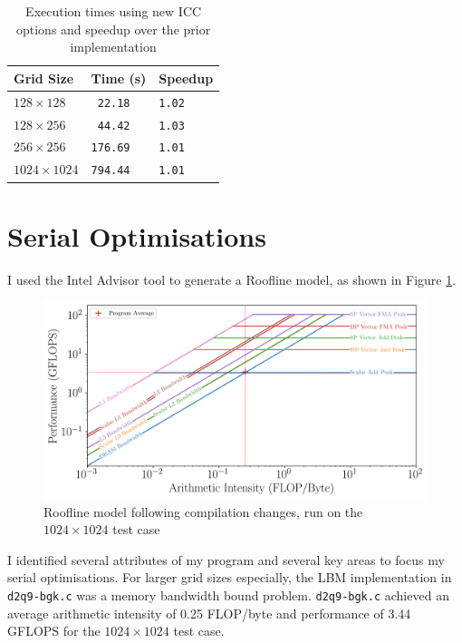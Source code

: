 \documentclass[twocolumn, a4paper]{article}
\begin{document}
\begin{table}[htbp]
  \begin{center}
  \caption{Execution times using new ICC options and speedup over the prior implementation}\label{tab:compiler_options}
  \begin{tabular}[t]{l | l l} 
      \hline\hline
      Grid Size&Time (s)&Speedup\\
      \hline
      $128 \times 128$&\texttt{ 22.18}&\texttt{1.02}\\
      $128 \times 256$&\texttt{ 44.42}&\texttt{1.03}\\
      $256 \times 256$&\texttt{176.69}&\texttt{1.01}\\
      $1024 \times 1024$&\texttt{794.44}&\texttt{1.01}\\
      \hline
    \end{tabular}
  \end{center}
  \vspace{-1em}
\end{table}

\section{Serial Optimisations}

I used the Intel Advisor tool to generate a Roofline model, as shown in Figure \ref{fig:roofline_compiler}.

\begin{figure}[htbp]
\includegraphics[width=\linewidth]{roofline_compiler.png}
\caption{Roofline model following compilation changes, run on the $1024\times1024$ test case}\label{fig:roofline_compiler}
\end{figure}

I identified several attributes of my program and several key areas to focus my serial optimisations.
For larger grid sizes especially, the LBM implementation in \texttt{d2q9-bgk.c} was a memory bandwidth bound problem.
\texttt{d2q9-bgk.c} achieved an average arithmetic intensity of 0.25 FLOP/byte and performance of 3.44 GFLOPS for the $1024 \times 1024$ test case.
\end{document}
